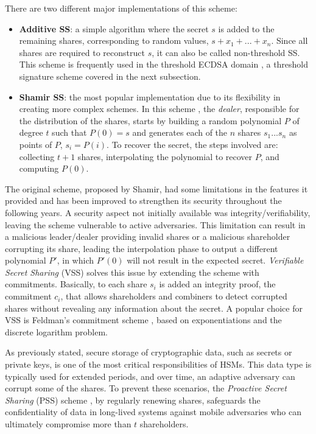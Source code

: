 There are two different major implementations of this scheme:
\begin{itemize}
    \item \textbf{Additive SS}: a simple algorithm where the secret $s$ is added to the remaining shares, corresponding to random values, $s + x_1 + ... + x_n$. Since all shares are required to reconstruct $s$, it can also be called non-threshold SS. This scheme is frequently used in the threshold ECDSA domain \cite{ecdsasurvey}, a threshold signature scheme covered in the next subsection.

    \item \textbf{Shamir SS}: the most popular implementation due to its flexibility in creating more complex schemes. In this scheme \cite{shamir}, the \textit{dealer}, responsible for the distribution of the shares, starts by building a random polynomial $P$ of degree $t$ such that $P(0) = s$ and generates each of the $n$ shares $s_1...s_n$ as points of $P$, $s_i = P(i)$. To recover the secret, the steps involved are: collecting $t + 1$ shares, interpolating the polynomial to recover $P$, and computing $P(0)$.
\end{itemize}

The original scheme, proposed by Shamir, had some limitations in the features it provided and has been improved to strengthen its security throughout the following years. A security aspect not initially available was integrity/verifiability, leaving the scheme vulnerable to active adversaries. This limitation can result in a malicious leader/dealer providing invalid shares or a malicious shareholder corrupting its share, leading the interpolation phase to output a different polynomial $P'$, in which $P'(0)$ will not result in the expected secret. \textit{Verifiable Secret Sharing} (VSS) solves this issue by extending the scheme with commitments. Basically, to each share $s_i$ is added an integrity proof, the commitment $c_i$, that allows shareholders and combiners to detect corrupted shares without revealing any information about the secret. A popular choice for VSS is Feldman's commitment scheme \cite{feldman}, based on exponentiations and the discrete logarithm problem.

As previously stated, secure storage of cryptographic data, such as secrets or private keys, is one of the most critical responsibilities of HSMs. This data type is typically used for extended periods, and over time, an adaptive adversary can corrupt some of the shares. To prevent these scenarios, the \textit{Proactive Secret Sharing} (PSS) scheme \cite{proactivess}, by regularly renewing shares, safeguards the confidentiality of data in long-lived systems against mobile adversaries who can ultimately compromise more than $t$ shareholders.

